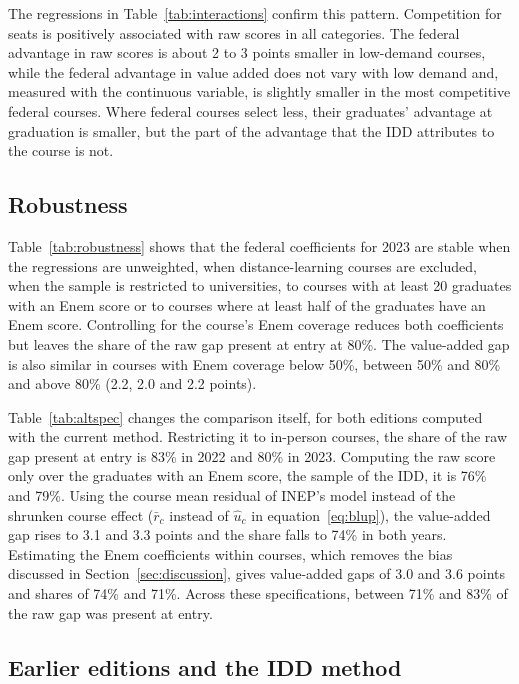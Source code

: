 \documentclass[12pt,letterpaper]{article}
\begin{document}
The regressions in Table~\ref{tab:interactions} confirm this pattern. Competition for seats is positively associated with raw scores in all categories. The federal advantage in raw scores is about 2 to 3 points smaller in low-demand courses, while the federal advantage in value added does not vary with low demand and, measured with the continuous variable, is slightly smaller in the most competitive federal courses. Where federal courses select less, their graduates' advantage at graduation is smaller, but the part of the advantage that the IDD attributes to the course is not.

\subsection{Robustness}

Table~\ref{tab:robustness} shows that the federal coefficients for 2023 are stable when the regressions are unweighted, when distance-learning courses are excluded, when the sample is restricted to universities, to courses with at least 20 graduates with an Enem score or to courses where at least half of the graduates have an Enem score. Controlling for the course's Enem coverage reduces both coefficients but leaves the share of the raw gap present at entry at 80\%. The value-added gap is also similar in courses with Enem coverage below 50\%, between 50\% and 80\% and above 80\% (2.2, 2.0 and 2.2 points).

Table~\ref{tab:altspec} changes the comparison itself, for both editions computed with the current method. Restricting it to in-person courses, the share of the raw gap present at entry is 83\% in 2022 and 80\% in 2023. Computing the raw score only over the graduates with an Enem score, the sample of the IDD, it is 76\% and 79\%. Using the course mean residual of INEP's model instead of the shrunken course effect ($\bar r_c$ instead of $\hat u_c$ in equation~\eqref{eq:blup}), the value-added gap rises to 3.1 and 3.3 points and the share falls to 74\% in both years. Estimating the Enem coefficients within courses, which removes the bias discussed in Section~\ref{sec:discussion}, gives value-added gaps of 3.0 and 3.6 points and shares of 74\% and 71\%. Across these specifications, between 71\% and 83\% of the raw gap was present at entry.

\subsection{Earlier editions and the IDD method}\label{sec:method_change}
\end{document}
